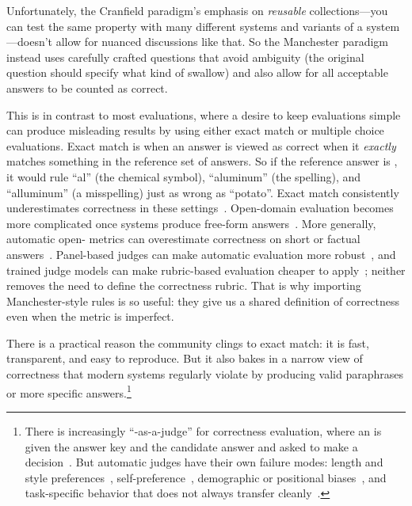 Unfortunately, the Cranfield paradigm's emphasis on \emph{reusable}
collections---you can test the same property with many different
systems and variants of a system---doesn't allow for nuanced
discussions like that.
%
So the Manchester paradigm instead uses carefully crafted questions
that avoid ambiguity (the original question should specify what kind of
swallow) and also allow for all acceptable answers to be counted as
correct.

This is in contrast to most  evaluations, where a desire to
keep evaluations simple can produce misleading results by using either
exact match or multiple choice evaluations.
%
Exact match is when an answer is viewed as correct when it \emph{exactly} matches something in the reference set of answers.
%
So if the reference answer is , it would rule
``al'' (the chemical symbol), ``aluminum'' (the  spelling),
and ``alluminum'' (a misspelling) just as wrong as ``potato''.
%
Exact match consistently underestimates correctness in these settings~\citep{bulian2022tomayto}.
Open-domain  evaluation becomes more complicated once systems produce
free-form answers~\citep{kamalloo-etal-2023-evaluating}. More generally,
automatic open- metrics can overestimate correctness on short or factual
answers~\citep{wang2023evaluating}.
Panel-based judges can make automatic evaluation more robust~\citep{verga2024replacingjudgesjuriesevaluating},
and trained judge models can make rubric-based evaluation cheaper to
apply~\citep{kim2024prometheus}; neither removes the need to define the
correctness rubric.
That is why importing Manchester-style rules is so useful: they give us a
shared definition of correctness even when the metric is imperfect.

There is a practical reason the community clings to exact match: it is fast,
transparent, and easy to reproduce. But it also bakes in a narrow view of
correctness that modern  systems regularly violate by producing valid
paraphrases or more specific answers.\footnote{There is increasingly
``-as-a-judge'' for correctness evaluation, where an  is given
the answer key and the candidate answer and asked to make a
decision~\citep{zheng2023judging}. But automatic judges have their own failure
modes: length and style preferences~\citep{li2023alpacaeval},
self-preference~\citep{xu-etal-2024-pride}, demographic or positional
biases~\citep{ye2024justice}, and task-specific behavior that does not always
transfer cleanly~\citep{huang2024empirical}.
%
}

